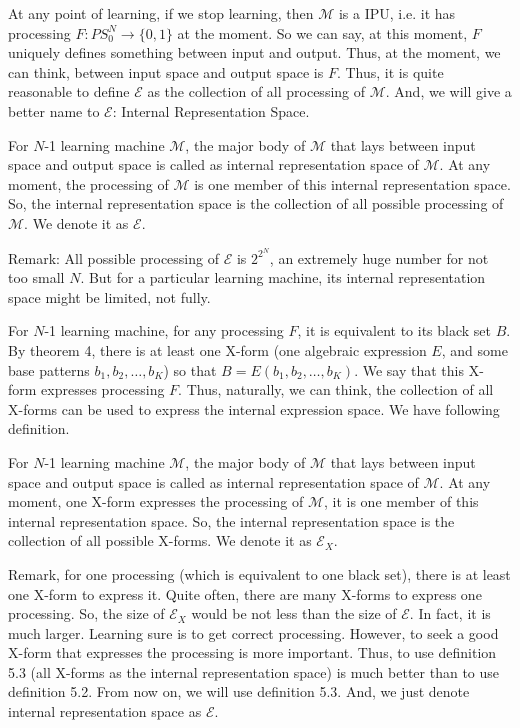 At any point of learning, if we stop learning, then $\mathcal{M}$ is a IPU, i.e. it has processing $F: PS^N_0 \to \{0, 1\}$ at the moment. So we can say, at this moment, $F$ uniquely defines something between input and output. Thus, at the moment, we can think, between input space and output space is $F$. Thus, it is quite reasonable to define $\mathcal{E}$ as the collection of all processing of $\mathcal{M}$. And, we will give a better name to $\mathcal{E}$: Internal Representation Space. 

\begin{definition}
For $N$-1 learning machine $\mathcal{M}$, the major body of $\mathcal{M}$ that lays between input space and output space is called as internal representation space of  $\mathcal{M}$. At any moment, the processing of $\mathcal{M}$ is one member of this internal representation space. So, the internal representation space is the collection of all possible processing of $\mathcal{M}$. We denote it as $\mathcal{E}$. 
\end{definition}
Remark: All possible processing of $\mathcal{E}$ is $2^{2^N}$, an extremely huge number for not too small $N$. But for a particular learning machine, its internal representation space might be limited, not fully. 

For $N$-1 learning machine, for any processing $F$, it is equivalent to its black set $B$. By theorem 4, there is at least one X-form (one algebraic expression $E$, and some base patterns $b_1, b_2, \ldots, b_K$) so that $B = E(b_1, b_2, \ldots, b_K)$. We say that this X-form expresses processing $F$. Thus, naturally, we can think, the collection of all X-forms can be used to express the internal expression space. We have following definition.


\begin{definition}
For $N$-1 learning machine $\mathcal{M}$, the major body of $\mathcal{M}$ that lays between input space and output space is called as internal representation space of  $\mathcal{M}$. At any moment, one X-form expresses the processing of $\mathcal{M}$, it is one member of this internal representation space. So, the internal representation space is the collection of all possible X-forms. We denote it as $\mathcal{E}_X$.
\end{definition}
Remark, for one processing (which is equivalent to one black set), there is at least one X-form to express it.
Quite often, there are many X-forms to express one processing. So, the size of $\mathcal{E}_X$ would be not less than the size of $\mathcal{E}$. In fact, it is much larger. Learning sure is to get correct processing. However, to seek a good X-form that expresses the processing is more important. Thus, to use definition 5.3 (all X-forms as the internal representation space) is much better than to use definition 5.2. From now on, we will use definition 5.3. And, we just denote internal representation space as $\mathcal{E}$.


